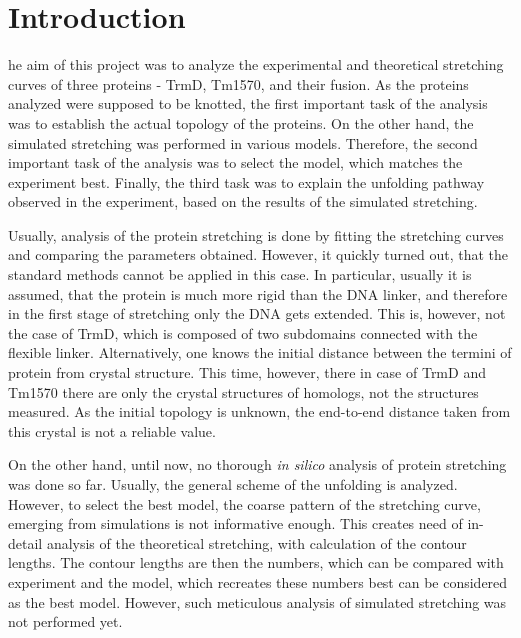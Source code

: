 \chapter{Introduction}
\label{ch:intro}

he aim of this project was to analyze the experimental and theoretical stretching curves of three proteins - TrmD, Tm1570, and their fusion.
As the proteins analyzed were supposed to be knotted, the first important task of the analysis was to establish the actual topology of the proteins.
On the other hand, the simulated stretching was performed in various models.
Therefore, the second important task of the analysis was to select the model, which matches the experiment best.
Finally, the third task was to explain the unfolding pathway observed in the experiment, based on the results of the simulated stretching.

Usually, analysis of the protein stretching is done by fitting the stretching curves and comparing the parameters obtained.
However, it quickly turned out, that the standard methods cannot be applied in this case.
In particular, usually it is assumed, that the protein is much more rigid than the DNA linker, and therefore in the first stage of stretching only the DNA gets extended.
This is, however, not the case of TrmD, which is composed of two subdomains connected with the flexible linker.
Alternatively, one knows the initial distance between the termini of protein from crystal structure.
This time, however, there in case of TrmD and Tm1570 there are only the crystal structures of homologs, not the structures measured.
As the initial topology is unknown, the end-to-end distance taken from this crystal is not a reliable value.


On the other hand, until now, no thorough \textit{in silico} analysis of protein stretching was done so far.
Usually, the general scheme of the unfolding is analyzed.
However, to select the best model, the coarse pattern of the stretching curve, emerging from simulations is not informative enough.
This creates need of in-detail analysis of the theoretical stretching, with calculation of the contour lengths.
The contour lengths are then the numbers, which can be compared with experiment and the model, which recreates these numbers best can be considered as the best model.
However, such meticulous analysis of simulated stretching was not performed yet.


